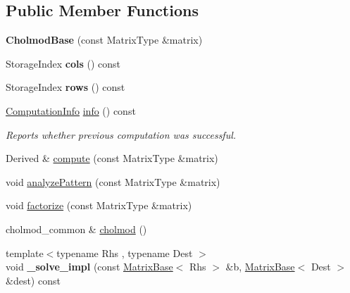 \subsection*{Public Member Functions}
\begin{DoxyCompactItemize}
\item 
\mbox{\label{class_eigen_1_1_cholmod_base_a1b54c3f3d0315a6c581c6ded51076bf6}} 
{\bfseries Cholmod\+Base} (const Matrix\+Type \&matrix)
\item 
\mbox{\label{class_eigen_1_1_cholmod_base_aa0b16898522cca48af94e96f8a27666d}} 
Storage\+Index {\bfseries cols} () const
\item 
\mbox{\label{class_eigen_1_1_cholmod_base_a849383115475b8bb4da3cfcc86a64e9e}} 
Storage\+Index {\bfseries rows} () const
\item 
\hyperlink{group__enums_ga85fad7b87587764e5cf6b513a9e0ee5e}{Computation\+Info} \hyperlink{class_eigen_1_1_cholmod_base_ada4cc43c64767d186fcb8997440cc753}{info} () const
\begin{DoxyCompactList}\small\item\em Reports whether previous computation was successful. \end{DoxyCompactList}\item 
Derived \& \hyperlink{class_eigen_1_1_cholmod_base_abaf5be01b1e3035a4de0b19f5b63549e}{compute} (const Matrix\+Type \&matrix)
\item 
void \hyperlink{class_eigen_1_1_cholmod_base_a5ac967e9f4ccfc43ca9e610b89232c24}{analyze\+Pattern} (const Matrix\+Type \&matrix)
\item 
void \hyperlink{class_eigen_1_1_cholmod_base_a5bd9c9ec4d1c15f202a6c66b5e9ef37b}{factorize} (const Matrix\+Type \&matrix)
\item 
cholmod\+\_\+common \& \hyperlink{class_eigen_1_1_cholmod_base_a6a85bf52d6aa480240a64f277d7f96c6}{cholmod} ()
\item 
\mbox{\label{class_eigen_1_1_cholmod_base_ad7002ebd76d3a5e6e86ab595d6cecc57}} 
{\footnotesize template$<$typename Rhs , typename Dest $>$ }\\void {\bfseries \+\_\+solve\+\_\+impl} (const \hyperlink{group___core___module_class_eigen_1_1_matrix_base}{Matrix\+Base}$<$ Rhs $>$ \&b, \hyperlink{group___core___module_class_eigen_1_1_matrix_base}{Matrix\+Base}$<$ Dest $>$ \&dest) const

\end{DoxyCompactItemize}
